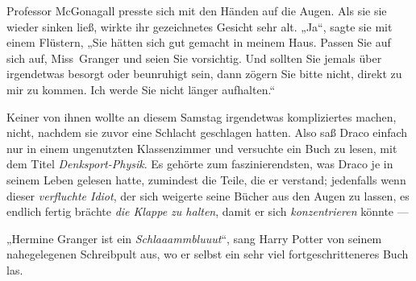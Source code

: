 Professor McGonagall presste sich mit den Händen auf die Augen. Als sie sie wieder sinken ließ, wirkte ihr gezeichnetes Gesicht sehr alt.
„Ja“, sagte sie mit einem Flüstern,
„Sie hätten sich gut gemacht in meinem Haus. Passen Sie auf sich auf, Miss~Granger und seien Sie vorsichtig. Und sollten Sie jemals über irgendetwas besorgt oder beunruhigt sein, dann zögern Sie bitte nicht, direkt zu mir zu kommen. Ich werde Sie nicht länger aufhalten.“


Keiner von ihnen wollte an diesem Samstag irgendetwas kompliziertes machen, nicht, nachdem sie zuvor eine Schlacht geschlagen hatten. Also saß Draco einfach nur in einem ungenutzten Klassenzimmer und versuchte ein Buch zu lesen, mit dem Titel \emph{Denksport-Physik}.%
Es gehörte zum faszinierendsten, was Draco je in seinem Leben gelesen hatte, zumindest die Teile, die er verstand; jedenfalls wenn dieser \emph{verfluchte Idiot}, der sich weigerte seine Bücher aus den Augen zu lassen, es endlich fertig brächte \emph{die Klappe zu halten}, damit er sich \emph{konzentrieren} könnte —

„Hermine Granger ist ein \emph{Schlaaammbluuut}“, sang Harry Potter von seinem nahegelegenen Schreibpult aus, wo er selbst ein sehr viel fortgeschritteneres Buch las.

